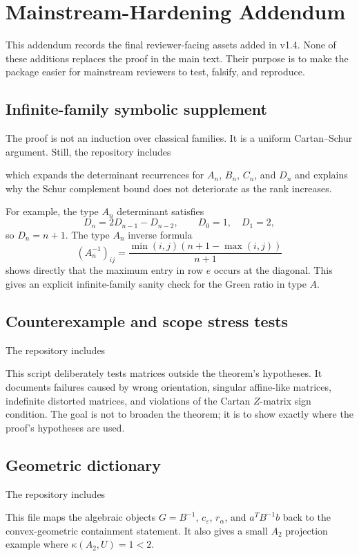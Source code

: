 \documentclass[11pt]{book}
\theoremstyle{definition}
\begin{document}
\chapter{Mainstream-Hardening Addendum}
This addendum records the final reviewer-facing assets added in v1.4. None of these additions replaces the proof in the main text. Their purpose is to make the package easier for mainstream reviewers to test, falsify, and reproduce.

\section*{Infinite-family symbolic supplement}
The proof is not an induction over classical families. It is a uniform Cartan--Schur argument. Still, the repository includes
\begin{center}\end{center}
which expands the determinant recurrences for $A_n$, $B_n$, $C_n$, and $D_n$ and explains why the Schur complement bound does not deteriorate as the rank increases.

For example, the type $A_n$ determinant satisfies
\[
D_n=2D_{n-1}-D_{n-2},\qquad D_0=1,\quad D_1=2,
\]
so $D_n=n+1$. The type $A_n$ inverse formula
\[
(A_n^{-1})_{ij}=\frac{\min(i,j)(n+1-\max(i,j))}{n+1}
\]
shows directly that the maximum entry in row $e$ occurs at the diagonal. This gives an explicit infinite-family sanity check for the Green ratio in type $A$.

\section*{Counterexample and scope stress tests}
The repository includes
\begin{center}\end{center}
This script deliberately tests matrices outside the theorem's hypotheses. It documents failures caused by wrong orientation, singular affine-like matrices, indefinite distorted matrices, and violations of the Cartan $Z$-matrix sign condition. The goal is not to broaden the theorem; it is to show exactly where the proof's hypotheses are used.

\section*{Geometric dictionary}
The repository includes
\begin{center}\end{center}
This file maps the algebraic objects $G=B^{-1}$, $c_\varepsilon$, $r_\alpha$, and $a^TB^{-1}b$ back to the convex-geometric containment statement. It also gives a small $A_2$ projection example where $\kappa(A_2,U)=1<2$.
\end{document}
